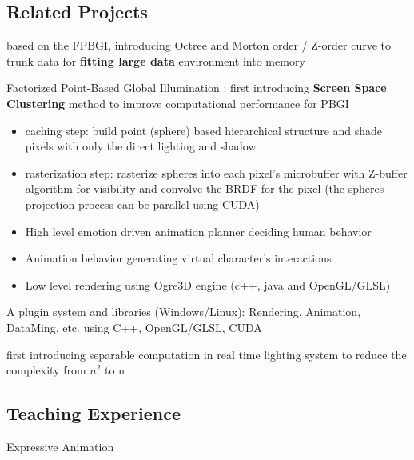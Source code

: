 \subsection{Related Projects}
{
based on the FPBGI, introducing Octree and Morton order / Z-order curve to trunk data for \textbf{fitting large data} environment into memory
}

{
Factorized Point-Based Global Illumination : first introducing \textbf{Screen Space Clustering} method to improve computational performance for PBGI
\begin{itemize}
	\item caching step: build point (sphere) based hierarchical structure and shade pixels with only the direct lighting and shadow
	\item rasterization step: rasterize spheres into each pixel's microbuffer with Z-buffer algorithm for visibility and convolve the BRDF for the pixel (the spheres projection process can be parallel using CUDA)
\end{itemize}
}

{
\begin{itemize}
\item High level emotion driven animation planner deciding human behavior
\item Animation behavior generating virtual character's interactions
\item Low level rendering using Ogre3D engine (c++, java and OpenGL/GLSL)
\end{itemize}
}

{
A plugin system and libraries (Windows/Linux): Rendering, Animation, DataMing, etc.
using C++, OpenGL/GLSL, CUDA
}

{
first introducing separable computation in real time lighting system to reduce the complexity from $n^2$ to n
}

\subsection{Teaching Experience}
{
Expressive Animation
}

